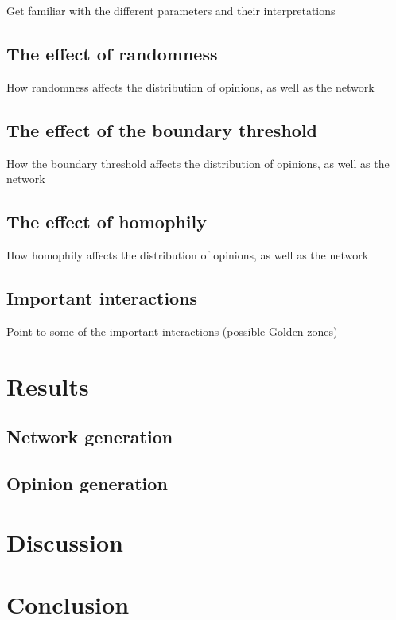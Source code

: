 \documentclass[9pt,twocolumn,twoside]{ilcss}
\begin{document}
Get familiar with the different parameters and their interpretations

\subsection{The effect of randomness}

How randomness affects the distribution of opinions, as well as the network

\subsection{The effect of the boundary threshold}

How the boundary threshold affects the distribution of opinions, as well as the network

\subsection{The effect of homophily}

How homophily affects the distribution of opinions, as well as the network

\subsection{Important interactions}

Point to some of the important interactions (possible Golden zones)

\section{Results}

\subsection{Network generation}

\subsection{Opinion generation}

\section{Discussion}

\section{Conclusion}
\end{document}
